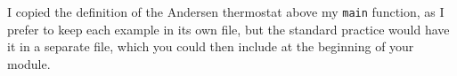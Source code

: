 I copied the definition of the Andersen thermostat above my \texttt{main} 
function, as I prefer to keep each example in its own file, but the standard 
practice would have it in a separate file, which you could then include at the 
beginning of your module.

